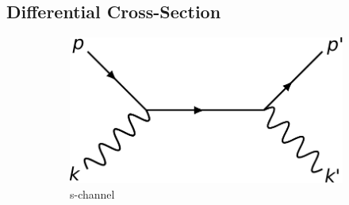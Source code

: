\subsection{Differential Cross-Section}
\begin{figure}
	\centering
	\begin{subfigure}{0.49\textwidth}
		\centering
		\includegraphics[width=\textwidth]{./img/s-channel.pdf}
		\caption{s-channel}
		\label{fig:schannel}
	\end{subfigure}
	\qquad\qquad
	\begin{subfigure}{0.2\textwidth}
		\centering

\end{subfigure}
\end{figure}
